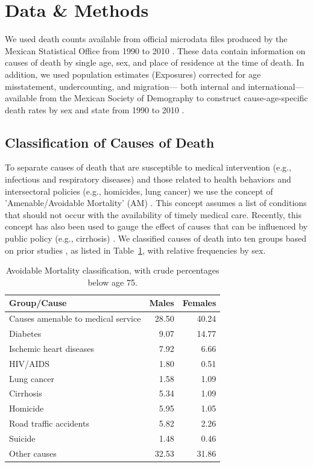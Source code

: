 \documentclass{article}
\begin{document}
\section*{Data \& Methods} 
 
We used death counts available from official microdata files produced by the
Mexican Statistical Office from 1990 to 2010 \citep{INEGI}. These data contain
information on causes of death by single age, sex, and place of residence at the
time of death. In addition, we used population estimates (Exposures) corrected
for age misstatement, undercounting, and migration--- both internal and
international--- available from the Mexican Society of Demography to construct
cause-age-specific death rates by sex and state from 1990 to 2010 \citep{SOMEDE}.

\subsection*{Classification of Causes of Death}

To separate causes of death that are susceptible to medical intervention (e.g.,
infectious and respiratory diseases) and those related to health behaviors and
intersectoral policies (e.g., homicides, lung cancer) we use the concept of
'Amenable/Avoidable Mortality' (AM) \citep{nolte&mckee2004, nolte&mckee2008}. This
concept assumes a list of conditions that should not occur with the availability
of timely medical care. Recently, this concept has also been used to gauge the
effect of causes that can be influenced by public policy (e.g., cirrhosis) \citep{elo2014}. We classified causes of death into ten groups based on prior studies
\citep{elo2014, Aburto2015}, as listed in Table~\ref{tab:causes}, with
relative frequencies by sex.

\begin{table}[ht]
\centering
\caption{Avoidable Mortality classification, with crude percentages below age 75.}
\label{tab:causes}
\begin{tabular}{>{\raggedright}m{3cm}rr}
Group/Cause  & Males & Females \\ 
  \hline
Causes amenable to medical service & 28.50 & 40.24 \\ 
  Diabetes & 9.07 & 14.77 \\ 
  Ischemic heart diseases & 7.92 & 6.66 \\ 
  HIV/AIDS & 1.80 & 0.51 \\ 
  Lung cancer & 1.58 & 1.09 \\ 
  Cirrhosis & 5.34 & 1.09 \\ 
  Homicide & 5.95 & 1.05 \\ 
  Road traffic accidents & 5.82 & 2.26 \\ 
  Suicide & 1.48 & 0.46 \\ 
  Other causes & 32.53 & 31.86 \\ 
   \hline
\end{tabular}
\end{table}
\end{document}
